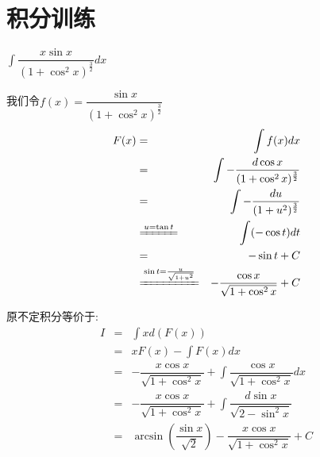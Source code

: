 \section*{积分训练}
\begin{proposition}
	$\int \dfrac{x\sin x}{(1+\cos^2x)^{\frac{3}{2}}}dx$
\end{proposition}
\begin{solution}
		
	我们令$f(x)=\dfrac{\sin x}{(1+\cos^2x)^{\frac{3}{2}}}$
	\begin{eqnarray*}
		F(x)&=&\int f(x)dx\\
			&=&\int -\dfrac{d\cos x}{(1+\cos^2x)^{\frac{3}{2}}}\\
			&=&\int -\dfrac{du}{(1+u^2)^{\frac{3}{2}}}\\
			&\xlongequal{u=\tan t}&\int (-\cos t)dt\\
			&=&-\sin t+C\\
			&\xlongequal{\sin t=\frac{u}{\sqrt{1+u^2}}}&-\dfrac{\cos x}{\sqrt{1+\cos^2 x}}+C
	\end{eqnarray*}
	
	原不定积分等价于:  
	\begin{eqnarray*}
		I&=&\int xd(F(x))\\
		&=&xF(x)-\int F(x)dx\\
		&=&-\dfrac{x\cos x}{\sqrt{1+\cos^2 x}}+\int \dfrac{\cos x}{\sqrt{1+\cos^2 x}}dx\\
		&=&-\dfrac{x\cos x}{\sqrt{1+\cos^2 x}}+\int \dfrac{d\sin x}{\sqrt{2-\sin^2 x}}\\
		&=&\arcsin(\dfrac{\sin x}{\sqrt{2}})-\dfrac{x\cos x}{\sqrt{1+\cos^2 x}}+C
	\end{eqnarray*}
\end{solution}

